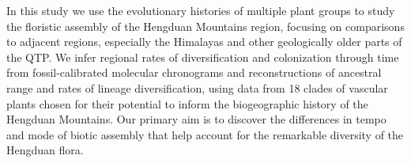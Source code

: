 


In this study we use the evolutionary histories of multiple plant groups to study the floristic assembly of the Hengduan Mountains region, focusing on comparisons to adjacent regions, especially the Himalayas and other geologically older parts of the QTP. We infer regional rates of diversification and colonization through time from fossil-calibrated molecular chronograms and reconstructions of ancestral range and rates of lineage diversification, using data from 18 clades of vascular plants chosen for their potential to inform the biogeographic history of the Hengduan Mountains. Our primary aim is to discover the differences in tempo and mode of biotic assembly that help account for the remarkable diversity of the Hengduan flora.



